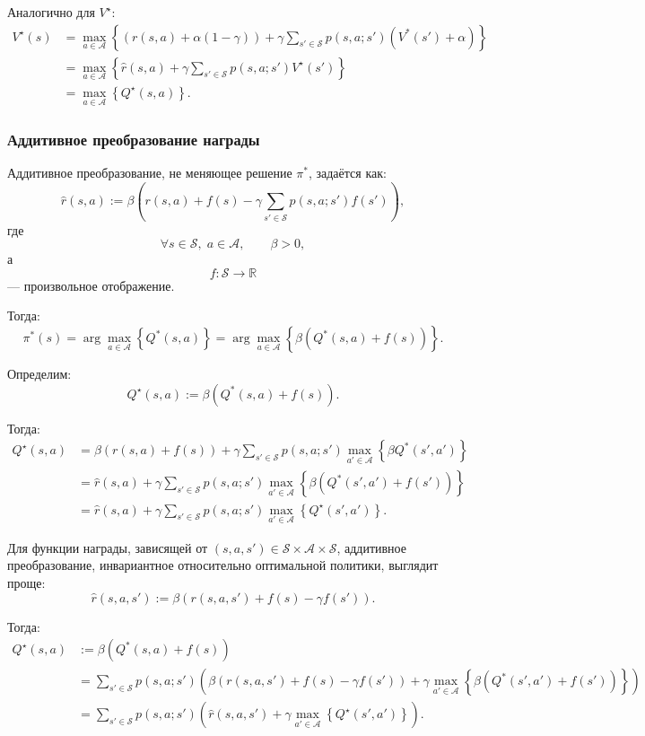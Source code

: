 \documentclass[12pt,a4paper]{article}
\begin{document}
Аналогично для $V^\star$:
\[
\begin{aligned}
V^\star(s)
&=
\max_{a \in \mathcal A}
\left\{
\left(
r(s,a)+\alpha(1-\gamma)
\right)
+
\gamma
\sum_{s' \in \mathcal S}
p(s,a;s')
\left(
V^\ast(s')+\alpha
\right)
\right\}
\\
&=
\max_{a \in \mathcal A}
\left\{
\hat r(s,a)
+
\gamma
\sum_{s' \in \mathcal S}
p(s,a;s')V^\star(s')
\right\}
\\
&=
\max_{a \in \mathcal A}
\left\{
Q^\star(s,a)
\right\}.
\end{aligned}
\]

\subsubsection{Аддитивное преобразование награды}

Аддитивное преобразование, не меняющее решение $\pi^\ast$, задаётся как:
\[
\hat r(s,a)
:=
\beta
\left(
r(s,a)
+
f(s)
-
\gamma
\sum_{s' \in \mathcal S}
p(s,a;s')f(s')
\right),
\]
где
\[
\forall s \in \mathcal S,\; a \in \mathcal A,
\qquad
\beta > 0,
\]
а
\[
f : \mathcal S \to \mathbb R
\]
--- произвольное отображение.

Тогда:
\[
\pi^\ast(s)
=
\arg\max_{a \in \mathcal A}
\left\{
Q^\ast(s,a)
\right\}
=
\arg\max_{a \in \mathcal A}
\left\{
\beta
\left(
Q^\ast(s,a)+f(s)
\right)
\right\}.
\]

Определим:
\[
Q^\star(s,a)
:=
\beta
\left(
Q^\ast(s,a)+f(s)
\right).
\]

Тогда:
\[
\begin{aligned}
Q^\star(s,a)
&=
\beta
\left(
r(s,a)+f(s)
\right)
+
\gamma
\sum_{s' \in \mathcal S}
p(s,a;s')
\max_{a' \in \mathcal A}
\left\{
\beta Q^\ast(s',a')
\right\}
\\
&=
\hat r(s,a)
+
\gamma
\sum_{s' \in \mathcal S}
p(s,a;s')
\max_{a' \in \mathcal A}
\left\{
\beta
\left(
Q^\ast(s',a')+f(s')
\right)
\right\}
\\
&=
\hat r(s,a)
+
\gamma
\sum_{s' \in \mathcal S}
p(s,a;s')
\max_{a' \in \mathcal A}
\left\{
Q^\star(s',a')
\right\}.
\end{aligned}
\]

Для функции награды, зависящей от $(s,a,s') \in \mathcal S \times \mathcal A \times \mathcal S$, аддитивное преобразование, инвариантное относительно оптимальной политики, выглядит проще:
\[
\hat r(s,a,s')
:=
\beta
\left(
r(s,a,s')+f(s)-\gamma f(s')
\right).
\]

Тогда:
\[
\begin{aligned}
Q^\star(s,a)
&:=
\beta
\left(
Q^\ast(s,a)+f(s)
\right)
\\
&=
\sum_{s' \in \mathcal S}
p(s,a;s')
\left(
\beta
\left(
r(s,a,s')+f(s)-\gamma f(s')
\right)
+
\gamma
\max_{a' \in \mathcal A}
\left\{
\beta
\left(
Q^\ast(s',a')+f(s')
\right)
\right\}
\right)
\\
&=
\sum_{s' \in \mathcal S}
p(s,a;s')
\left(
\hat r(s,a,s')
+
\gamma
\max_{a' \in \mathcal A}
\left\{
Q^\star(s',a')
\right\}
\right).
\end{aligned}
\]
\end{document}

